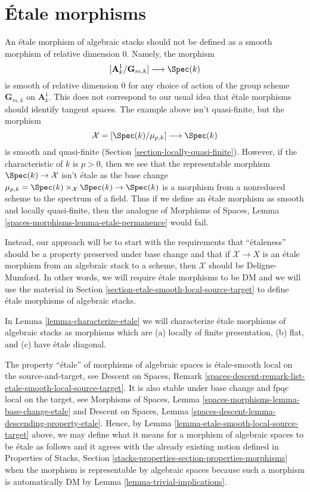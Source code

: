 \section{\'Etale morphisms}
\label{section-etale}

\noindent
An \'etale morphism of algebraic stacks should not be defined as a
smooth morphism of relative dimension $0$. Namely, the morphism
$$
[\mathbf{A}^1_k/\mathbf{G}_{m, k}] \longrightarrow \Spec(k)
$$
is smooth of relative dimension $0$ for any choice of action
of the group scheme $\mathbf{G}_{m, k}$ on $\mathbf{A}^1_k$.
This does not correspond to our usual idea that \'etale morphisms
should identify tangent spaces. The example above isn't quasi-finite,
but the morphism
$$
\mathcal{X} = [\Spec(k)/\mu_{p, k}] \longrightarrow \Spec(k)
$$
is smooth and quasi-finite (Section \ref{section-locally-quasi-finite}).
However, if the characteristic of $k$ is $p > 0$, then we see
that the representable morphism $\Spec(k) \to \mathcal{X}$
isn't \'etale as the base change
$\mu_{p, k} = \Spec(k) \times_\mathcal{X} \Spec(k) \to \Spec(k)$
is a morphism from a nonreduced scheme to the spectrum of a field.
Thus if we define an \'etale morphism as smooth and locally quasi-finite,
then the analogue of Morphisms of Spaces, Lemma
\ref{spaces-morphisms-lemma-etale-permanence} would fail.

\medskip\noindent
Instead, our approach will be to start with the requirements that
``\'etaleness'' should be a property preserved under base change and that if
$\mathcal{X} \to X$ is an \'etale morphism from an algebraic stack
to a scheme, then $\mathcal{X}$ should be Deligne-Mumford.
In other words, we will require \'etale morphisms to be DM and
we will use the material in
Section \ref{section-etale-smooth-local-source-target} to define
\'etale morphisms of algebraic stacks.

\medskip\noindent
In Lemma \ref{lemma-characterize-etale} we will characterize
\'etale morphisms of algebraic stacks as morphisms which are
(a) locally of finite presentation,
(b) flat, and (c) have \'etale diagonal.

\medskip\noindent
The property ``\'etale'' of morphisms of algebraic spaces
is \'etale-smooth local on the source-and-target, see
Descent on Spaces, Remark
\ref{spaces-descent-remark-list-etale-smooth-local-source-target}.
It is also stable under base change and fpqc local on the target, see
Morphisms of Spaces,
Lemma \ref{spaces-morphisms-lemma-base-change-etale}
and
Descent on Spaces,
Lemma \ref{spaces-descent-lemma-descending-property-etale}.
Hence, by
Lemma \ref{lemma-etale-smooth-local-source-target}
above, we may define what it means for a morphism of algebraic spaces
to be \'etale as follows and it agrees with the already existing notion
defined in Properties of Stacks, Section
\ref{stacks-properties-section-properties-morphisms}
when the morphism is representable by algebraic spaces
because such a morphism is automatically DM by
Lemma \ref{lemma-trivial-implications}.

